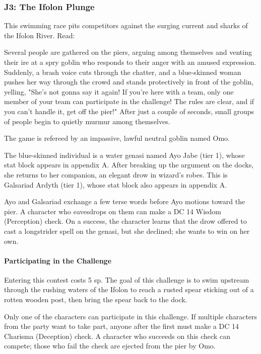 \documentclass[10pt,a4paper,twoside,bg=print,twocolumn,openany,nodeprecatedcode]{dndbook}
\begin{document}
\subsubsection{J3: The Ifolon Plunge}
This swimming race pits competitors against the surging current and sharks of the Ifolon River. Read:

\begin{DndReadAloud}{}
Several people are gathered on the piers, arguing among themselves and venting their ire at a spry goblin who responds to their anger with an amused expression. Suddenly, a brash voice cuts through the chatter, and a blue-skinned woman pushes her way through the crowd and stands protectively in front of the goblin, yelling, "She's not gonna say it again! If you're here with a team, only one member of your team can participate in the challenge! The rules are clear, and if you can't handle it, get off the pier!" After just a couple of seconds, small groups of people begin to quietly murmur among themselves.

\end{DndReadAloud}

The game is refereed by an impassive, lawful neutral goblin named Omo.

The blue-skinned individual is a water genasi named Ayo Jabe (tier 1), whose stat block appears in appendix A. After breaking up the argument on the docks, she returns to her companion, an elegant drow in wizard's robes. This is Galsariad Ardyth (tier 1), whose stat block also appears in appendix A.

Ayo and Galsariad exchange a few terse words before Ayo motions toward the pier. A character who eavesdrops on them can make a DC 14 Wisdom (Perception) check. On a success, the character learns that the drow offered to cast a longstrider spell on the genasi, but she declined; she wants to win on her own.

\paragraph{Participating in the Challenge}
Entering this contest costs 5 sp. The goal of this challenge is to swim upstream through the rushing waters of the Ifolon to reach a rusted spear sticking out of a rotten wooden post, then bring the spear back to the dock.

Only one of the characters can participate in this challenge. If multiple characters from the party want to take part, anyone after the first must make a DC 14 Charisma (Deception) check. A character who succeeds on this check can compete; those who fail the check are ejected from the pier by Omo.
\end{document}

